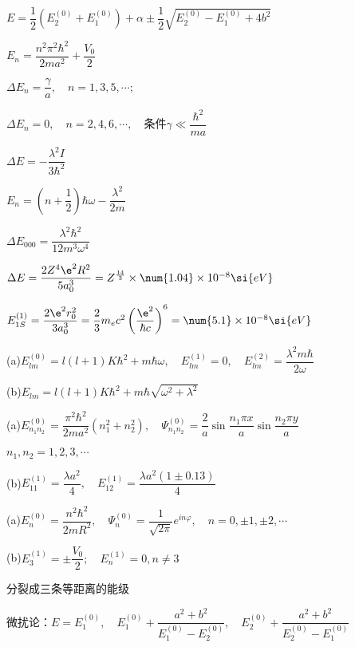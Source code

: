 \achapter

\answer $ E=\dfrac{1}{2}(E_{2}^{(0)}+E_{1}^{(0)})+\alpha\pm\dfrac{1}{2}\sqrt{E_{2}^{(0)}-E_{1}^{(0)}+4b^{2}} $

\answer $ E_{n}=\dfrac{n^{2}\pi^{2}\hbar^{2}}{2ma^{2}}+\dfrac{V_{0}}{2} $

\answer $ \Delta E_{n}=\dfrac{\gamma}{a},\quad n=1,3,5,\cdots;\quad $

		$ \Delta E_{n}=0,\quad n=2,4,6,\cdots,\quad  $条件$\gamma\ll\dfrac{\hbar^{2}}{ma}$

\answer $ \Delta E=-\dfrac{\lambda^{2}I}{3\hbar^{2}} $

\answer $ E_{n}=\left(n+\dfrac{1}{2}\right)\hbar\omega-\dfrac{\lambda^{2}}{2m} $

\answer $ \Delta E_{000}=\dfrac{\lambda^{2}\hbar^{2}}{12m^{3}\omega^{4}} $

\answer $ \Delta E=\dfrac{2Z^{4}\e^{2}R^{2}}{5a_{0}^{3}}=Z^{\frac{14}{3}}\times\num{1.04}\times10^{-8}\si{eV} $

\answer $ E_{1S}^{(1)}=\dfrac{2\e^{2}r_{0}^{2}}{3a_{0}^{3}}=\dfrac{2}{3}m_{e}c^{2}\left(\dfrac{\e^{2}}{\hbar c}\right)^{6}=\num{5.1}\times10^{-8}\si{eV} $

\answer (a)$ E_{lm}^{(0)}=l(l+1)K\hbar^{2}+m\hbar\omega,\quad E_{lm}^{(1)}=0,\quad E_{lm}^{(2)}=\dfrac{\lambda^{2}m\hbar}{2\omega} $

		(b)$ E_{lm}=l(l+1)K\hbar^{2}+m\hbar\sqrt{\omega^{2}+\lambda^{2}} $

\answer (a)$ E_{n_{1}n_{2}}^{(0)}=\dfrac{\pi^{2}\hbar^{2}}{2ma^{2}}(n_{1}^{2}+n_{2}^{2}),\quad \varPsi_{n_{1}n_{2}}^{(0)}=\dfrac{2}{a}\sin\dfrac{n_{1}\pi x}{a}\sin\dfrac{n_{2}\pi y}{a}\quad  $

\aindent	$ n_{1},n_{2}=1,2,3,\cdots $

(b)$ E_{11}^{(1)}=\dfrac{\lambda a^{2}}{4},\quad E_{12}^{(1)}=\dfrac{\lambda a^{2}(1\pm0.13)}{4} $

\answer (a)$ E_{n}^{(0)}=\dfrac{n^{2}\hbar^{2}}{2mR^{2}},\quad \varPsi_{n}^{(0)}=\dfrac{1}{\sqrt{2\pi}}e^{in\varphi},\quad n=0,\pm1,\pm2,\cdots $

		(b)$ E_{3}^{(1)}=\pm\dfrac{V_{0}}{2};\quad E_{n}^{(1)}=0,n\neq3 $

\answer 分裂成三条等距离的能级

\answer 微扰论：$ E=E_{1}^{(0)},\quad E_{1}^{(0)}+\dfrac{a^{2}+b^{2}}{E_{1}^{(0)}-E_{2}^{(0)}},\quad E_{2}^{(0)}+\dfrac{a^{2}+b^{2}}{E_{2}^{(0)}-E_{1}^{(0)}} $

